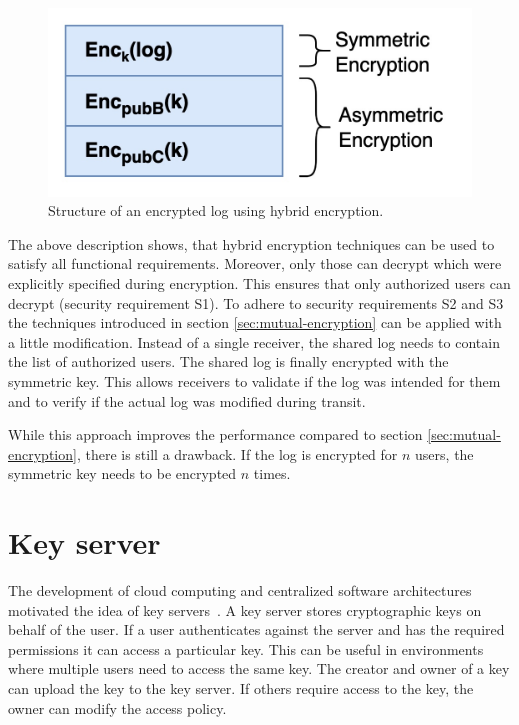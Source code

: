 \documentclass[../main.tex]{subfiles}
\begin{document}
\begin{figure}[ht]
    \includegraphics[scale=0.2]{../img/04/hybrid_encryption.jpg}
    \centering
    \caption{Structure of an encrypted log using hybrid encryption.}
    \label{fig:hybrid_encryption}
\end{figure}

The above description shows, that hybrid encryption techniques can be used to satisfy all functional requirements.
Moreover, only those can decrypt which were explicitly specified during encryption.
This ensures that only authorized users can decrypt (security requirement S1).
To adhere to security requirements S2 and S3 the techniques introduced in section \ref{sec:mutual-encryption} can be applied with a little modification.
Instead of a single receiver, the shared log needs to contain the list of authorized users.
The shared log is finally encrypted with the symmetric key.
This allows receivers to validate if the log was intended for them and to verify if the actual log was modified during transit.

While this approach improves the performance compared to section \ref{sec:mutual-encryption}, there is still a drawback.
If the log is encrypted for $n$ users, the symmetric key needs to be encrypted $n$ times.

\section{Key server}
\label{sec:key-server}
The development of cloud computing and centralized software architectures motivated the idea of key servers~\cite{Seitz2003}.
A key server stores cryptographic keys on behalf of the user.
If a user authenticates against the server and has the required permissions it can access a particular key.
This can be useful in environments where multiple users need to access the same key.
The creator and owner of a key can upload the key to the key server.
If others require access to the key, the owner can modify the access policy.
\end{document}
